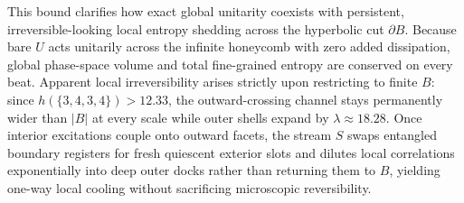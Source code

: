 This bound clarifies how exact global unitarity coexists with persistent, irreversible-looking local entropy shedding
across the hyperbolic cut $\partial B$. Because bare $U$ acts unitarily across the infinite honeycomb with zero added
dissipation, global phase-space volume and total fine-grained entropy are conserved on every beat. Apparent local
irreversibility arises strictly upon restricting to finite $B$: since $h(\{3,4,3,4\}) > 12.33$, the outward-crossing
channel stays permanently wider than $|B|$ at every scale while outer shells expand by $\lambda \approx 18.28$. Once
interior excitations couple onto outward facets, the stream $S$ swaps entangled boundary registers for fresh quiescent
exterior slots and dilutes local correlations exponentially into deep outer docks rather than returning them to $B$,
yielding one-way local cooling without sacrificing microscopic reversibility.
